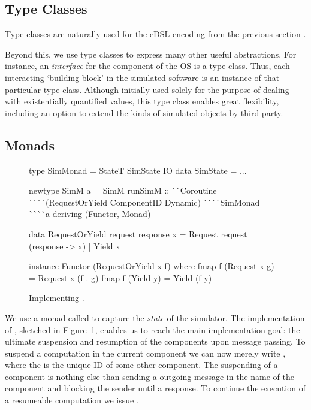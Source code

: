 \subsection{Type Classes}
Type classes are naturally used for the eDSL encoding from the previous section \cite{Hall:1996:TCH:227699.227700,final_tagless_embedding}.

Beyond this, we use type classes to express many other useful abstractions.
For instance, an \emph{interface} for the component of the OS is a type class.
Thus, each interacting `building block' in the simulated software is an instance of that particular type class.
Although initially used solely for the purpose of dealing with existentially quantified values, this  type class enables great flexibility, including an option to extend the kinds of simulated objects by third party.

\subsection{Monads}
\label{sec:impl-monads}
\begin{figure}
\begin{code}
type SimMonad  =  StateT SimState IO
data SimState  = ...

newtype SimM a
  = SimM { runSimM ::
      ^^ ^^ Coroutine
      ^^ ^^ ^^ ^^ (RequestOrYield ComponentID Dynamic)
      ^^ ^^ ^^ ^^ SimMonad
      ^^ ^^ ^^ ^^ a 
    } deriving (Functor, Monad)

data RequestOrYield request response x
  =  Request request (response -> x)
  |  Yield   x

instance Functor (RequestOrYield x f) where
  fmap f (Request x g)  = Request x (f . g)
  fmap f (Yield y)      = Yield (f y)
\end{code}
\vspace{-0.5em}
\caption{Implementing .}
\vspace{-1.5em}
\label{fig:code-simm}
\end{figure}

We use a monad called  to capture the \emph{state} of the simulator.
The implementation of \hspace{-1pt}, sketched in Figure~\ref{fig:code-simm}, enables us to reach the main implementation goal: the ultimate suspension and resumption of the components upon message passing.
To suspend a computation in the current component we can now merely write , where the  is the unique ID of some other component.
The suspending of a component is nothing else than sending a outgoing message in the name of the component and blocking the sender until a response.
To continue the execution of a resumeable computation we issue  \mbox{.} %


